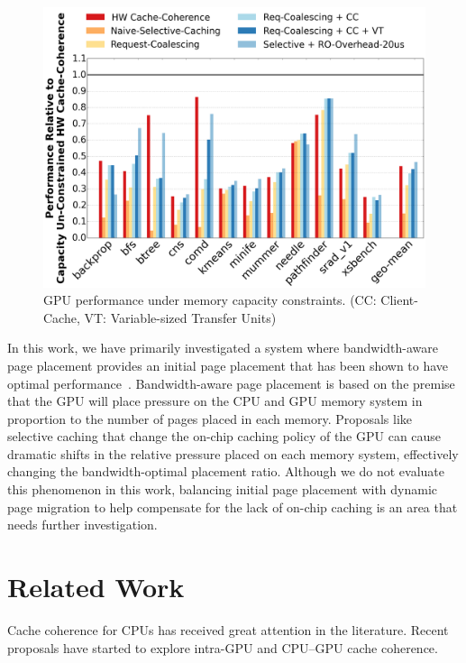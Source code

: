 \begin{figure}[t]
\includegraphics[width=1.0\columnwidth]{figures/capacityconstrained.png}
\caption{GPU performance under memory capacity constraints. (CC: Client-Cache,
VT: Variable-sized Transfer Units)}
\label{fig:capacityconstrained}
\end{figure}

In this work, we have primarily investigated a system where bandwidth-aware page placement
provides an initial page placement that has been shown to have optimal performance~\cite{Agarwal2015}.
Bandwidth-aware page placement is based on the premise that the GPU will place pressure on
the CPU and GPU memory system in proportion to the number of pages placed in each memory.  Proposals
like selective caching that change the on-chip caching policy of the GPU can cause dramatic
shifts in the relative pressure placed on each memory system, effectively changing the bandwidth-optimal 
placement ratio.  Although we do not evaluate this phenomenon in this work, balancing
initial page placement with dynamic page migration to help compensate for the lack of on-chip
caching is an area that needs further investigation.

\section{Related Work}
\label{related_work}

Cache coherence for CPUs has received great attention in the literature.
Recent proposals have started to explore intra-GPU and CPU--GPU cache coherence.

